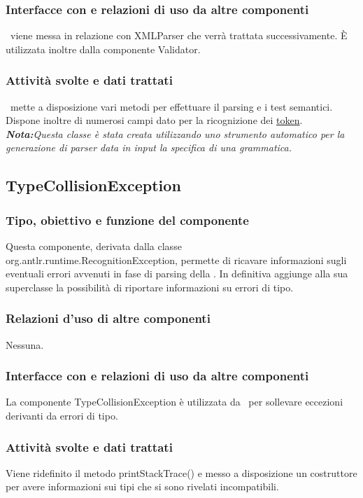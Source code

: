 \subsubsection{Interfacce con e relazioni di uso da altre componenti}
\brp\ viene messa in relazione con XMLParser che verr\`a trattata successivamente.
\`E utilizzata inoltre dalla componente Validator.
\subsubsection{Attivit\`a svolte e dati trattati}
\brp\ mette a disposizione vari metodi per effettuare il parsing e i test semantici. Dispone inoltre di numerosi campi dato per la ricognizione dei \underline{token}.\\
\textit{\textbf{Nota:}Questa classe \`e stata creata utilizzando uno strumento automatico per la generazione di parser data in input la specifica di una grammatica.}

\subsection{TypeCollisionException}
\subsubsection{Tipo, obiettivo e funzione del componente}
Questa componente, derivata dalla classe\\ org.antlr.runtime.RecognitionException, permette di ricavare informazioni sugli eventuali errori avvenuti in fase di parsing della \br. In definitiva aggiunge alla sua superclasse la possibilit\`a di riportare informazioni su errori di tipo.
\subsubsection{Relazioni d'uso di altre componenti}
Nessuna.
\subsubsection{Interfacce con e relazioni di uso da altre componenti}
La componente TypeCollisionException \`e utilizzata da \brp\ per sollevare eccezioni derivanti da errori di tipo.
\subsubsection{Attivit\`a svolte e dati trattati}
Viene ridefinito il metodo printStackTrace() e messo a disposizione un costruttore per avere informazioni sui tipi che si sono rivelati incompatibili.

